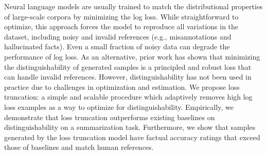 Neural language models are usually trained to match the distributional properties of large-scale corpora by minimizing the log loss. While straightforward to optimize, this approach forces the model to reproduce all variations in the dataset, including noisy and invalid references (e.g., misannotations and hallucinated facts). Even a small fraction of noisy data can degrade the performance of log loss. As an alternative, prior work has shown that minimizing the distinguishability of generated samples is a principled and robust loss that can handle invalid references. However, distinguishability has not been used in practice due to challenges in optimization and estimation. We propose loss truncation: a simple and scalable procedure which adaptively removes high log loss examples as a way to optimize for distinguishability. Empirically, we demonstrate that loss truncation outperforms existing baselines on distinguishability on a summarization task. Furthermore, we show that samples generated by the loss truncation model have factual accuracy ratings that exceed those of baselines and match human references.
